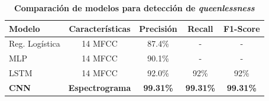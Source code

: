 \documentclass[12pt]{report}
\begin{document}
\begin{table}[htbp]
\centering
\caption{\textbf{Comparación de modelos para detección de \textit{queenlessness}}}
\label{tab:comparison_models}
\begin{tabular}{|l|c|c|c|c|}
\hline
\textbf{Modelo} & \textbf{Características} & \textbf{Precisión} & \textbf{Recall} & \textbf{F1-Score} \\
\hline
Reg. Logística & 14 MFCC & 87.4\% & - & - \\
MLP & 14 MFCC & 90.1\% & - & - \\
LSTM & 14 MFCC & 92.0\% & 92\% & 92\% \\
\textbf{CNN} & \textbf{Espectrograma} & \textbf{99.31\%} & \textbf{99.31\%} & \textbf{99.31\%} \\
\hline
\end{tabular}
\end{table}
\end{document}
